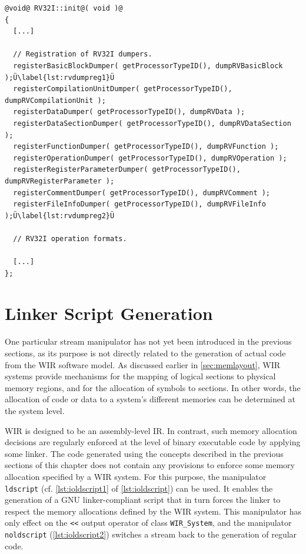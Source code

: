 \begin{lstlisting}[style=code,float=t,caption={Dumper Function Registration (here for Class \texttt{RV32I})},label=lst:rvdumpreg]
@void@ RV32I::init@( void )@
{
  [...]

  // Registration of RV32I dumpers.
  registerBasicBlockDumper( getProcessorTypeID(), dumpRVBasicBlock );Ü\label{lst:rvdumpreg1}Ü
  registerCompilationUnitDumper( getProcessorTypeID(), dumpRVCompilationUnit );
  registerDataDumper( getProcessorTypeID(), dumpRVData );
  registerDataSectionDumper( getProcessorTypeID(), dumpRVDataSection );
  registerFunctionDumper( getProcessorTypeID(), dumpRVFunction );
  registerOperationDumper( getProcessorTypeID(), dumpRVOperation );
  registerRegisterParameterDumper( getProcessorTypeID(), dumpRVRegisterParameter );
  registerCommentDumper( getProcessorTypeID(), dumpRVComment );
  registerFileInfoDumper( getProcessorTypeID(), dumpRVFileInfo );Ü\label{lst:rvdumpreg2}Ü

  // RV32I operation formats.

  [...]
};
\end{lstlisting}


\section{Linker Script Generation}
\label{sec:ldscripts}

One particular stream manipulator has not yet been introduced in the previous sections, as its purpose is not directly related to the generation of actual code from the \gls{WIR} software model.
As discussed earlier in \cref{sec:memlayout}, \gls{WIR} systems provide mechanisms for the mapping of logical sections to physical memory regions, and for the allocation of symbols to sections.
In other words, the allocation of code or data to a system's different memories can be determined at the system level.

\gls{WIR} is designed to be an assembly-level \gls{IR}.
In contrast, such memory allocation decisions are regularly enforced at the level of binary executable code by applying some linker.
The code generated using the concepts described in the previous sections of this chapter does not contain any provisions to enforce some memory allocation specified by a \gls{WIR} system.
For this purpose, the manipulator \texttt{ldscript} (cf. \cref{lst:ioldscript1} of \cref{lst:ioldscript}) can be used.
It enables the generation of a GNU linker-compliant script that in turn forces the linker to respect the memory allocations defined by the \gls{WIR} system.
This manipulator has only effect on the \texttt{<{}<} output operator of class \texttt{WIR\_System}, and the manipulator \texttt{noldscript} (\cref{lst:ioldscript2}) switches a stream back to the generation of regular code.

